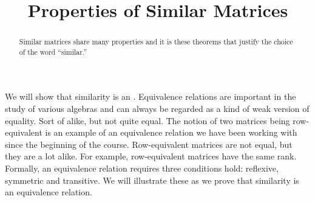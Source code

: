 \documentclass{ximera}
\title{Properties of Similar Matrices}
\begin{document}
\begin{abstract}
  Similar matrices share many properties and it is these theorems that
  justify the choice of the word ``similar.''
\end{abstract}
\maketitle

We will show that similarity is an .
Equivalence relations are important in the study of various algebras
and can always be regarded as a kind of weak version of equality.
Sort of alike, but not quite equal.  The notion of two matrices being
row-equivalent is an example of an equivalence relation we have been
working with since the beginning of the course.  Row-equivalent
matrices are not equal, but they are a lot alike.  For example,
row-equivalent matrices have the same rank.  Formally, an equivalence
relation requires three conditions hold: reflexive, symmetric and
transitive.  We will illustrate these as we prove that similarity is
an equivalence relation.
\end{document}
